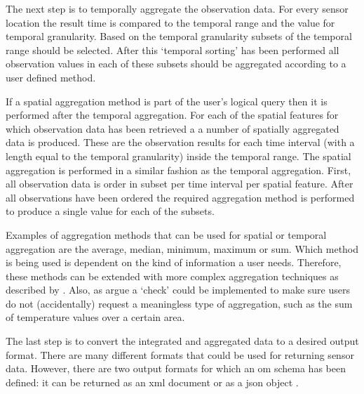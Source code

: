 The next step is to temporally aggregate the observation data. For every sensor location the result time is compared to the temporal range and the value for temporal granularity. Based on the temporal granularity subsets of the temporal range should be selected. After this `temporal sorting' has been performed all observation values in each of these subsets should be aggregated according to a user defined method. 

If a spatial aggregation method is part of the user's logical query then it is performed after the temporal aggregation. For each of the spatial features for which observation data has been retrieved a a number of spatially aggregated data is produced. These are the observation results for each time interval (with a length equal to the temporal granularity) inside the temporal range. The spatial aggregation is performed in a similar fashion as the temporal aggregation. First, all observation data is order in subset per time interval per spatial feature. After all observations have been ordered the required aggregation method is performed to produce a single value for each of the subsets. 

Examples of aggregation methods that can be used for spatial or temporal aggregation are the average, median, minimum, maximum or sum. Which method is being used is dependent on the kind of information a user needs. Therefore, these methods can be extended with more complex aggregation techniques as described by \cite{SW:Ganesan}. Also, as \cite{SSW:Stasch4} argue a `check' could be implemented to make sure users do not (accidentally) request a meaningless type of aggregation, such as the sum of temperature values over a certain area. 

The last step is to convert the integrated and aggregated data to a desired output format. There are many different formats that could be used for returning sensor data. However, there are two output formats for which an \ac{om} schema has been defined: it can be returned as an \ac{xml} document \citep{SW:ISO} or as a \ac{json} object \citep{SW:OGC6}.  




